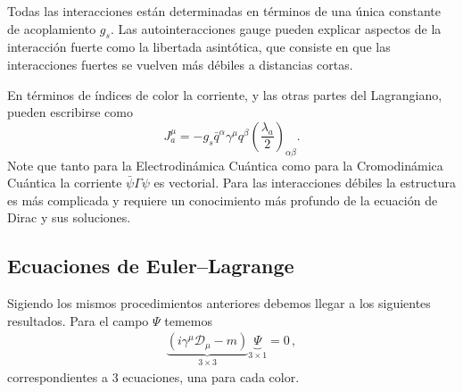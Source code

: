Todas las interacciones están determinadas en términos de una única constante de acoplamiento $g_s$. Las autointeracciones gauge pueden explicar aspectos de la interacción fuerte como la libertada asintótica, que consiste en que las interacciones fuertes se vuelven más débiles a distancias cortas. 

En términos de índices de color la corriente, y las otras partes del Lagrangiano, pueden escribirse como
\begin{equation}
  \label{eq:223qft}
  J^\mu_a=-g_s\bar{q}^\alpha\gamma^\mu q^\beta\left(\frac{\lambda_a}{2}\right)_{\alpha\beta}.
\end{equation}
Note que tanto para la Electrodinámica Cuántica como para la Cromodinámica Cuántica la corriente $\bar{\psi}\Gamma\psi$ es vectorial. Para las interacciones débiles la estructura es más complicada y requiere un conocimiento más profundo de la ecuación de Dirac y sus soluciones.


\subsection{Ecuaciones de Euler--Lagrange}
\label{sec:ecuaciones-de-euler-1}
Sigiendo los mismos procedimientos anteriores debemos llegar a los siguientes resultados. Para el campo $\Psi$ tememos
\begin{align}
  \underbrace{(i\gamma^\mu\mathcal{D}_\mu-m)}_{3\times 3 }\underbrace{\Psi}_{3\times 1}=0\,,
\end{align}
correspondientes a 3 ecuaciones, una para cada color.

